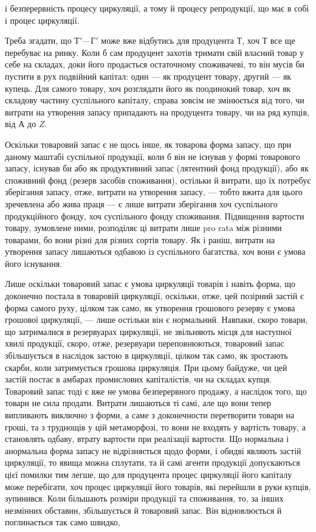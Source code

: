 \parcont{}  %
і безперервність процесу циркуляції, а тому й процесу репродукції, що
має в собі і процес циркуляції.

Треба згадати, що $Т' — Г'$ може вже відбутись для продуцента $Т$,
хоч $Т$ все ще перебуває на ринку. Коли б сам продуцент захотів тримати
свій власний товар у себе на складах, доки його продасться остаточному
споживачеві, то він мусів би пустити в рух подвійний капітал:
один — як продуцент товару, другий — як купець. Для самого товару,
хоч розглядати його як поодинокий товар, хоч як складову частину
суспільного капіталу, справа зовсім не змінюється від того, чи витрати
на утворення запасу припадають на продуцента товару, чи на ряд купців,
від $А$ до $Z$.

Оскільки товаровий запас є не щось інше, як товарова форма запасу,
що при даному маштабі суспільної продукції, коли б він не існував у
формі товарового запасу, існував би або як продуктивний запас (лятентний
фонд продукції), або як споживний фонд (резерв засобів споживання),
остільки й витрати, що їх потребує зберігання запасу, отже, витрати на
утворення запасу, — тобто вжита для цього зречевлена або жива праця —
є лише витрати зберігання хоч суспільного продукційного фонду,
хоч суспільного фонду споживання. Підвищення вартости товару,
зумовлене ними, розподіляє ці витрати лише pro rata між різними
товарами, бо вони різні для різних сортів товару. Як і раніш,
витрати на утворення запасу лишаються одбавою із суспільного багатства,
хоч вони є умова його існування.

Лише оскільки товаровий запас є умова циркуляції товарів і навіть
форма, що доконечно постала в товаровій циркуляції, оскільки, отже,
цей позірний застій є форма самого руху, цілком так само, як утворення
грошового резерву є умова грошової циркуляції, — лише остільки
він є нормальний. Навпаки, скоро товари, що затрималися в резервуарах
циркуляції, не звільняють місця для наступної хвилі продукції,
скоро, отже, резервуари переповнюються, товаровий запас збільшується
в наслідок застою в циркуляції, цілком так само, як зростають
скарби, коли затримується грошова циркуляція. При цьому
байдуже, чи цей застій постає в амбарах промислових капіталістів, чи
на складах купця. Товаровий запас тоді є вже не умова безперервного
продажу, а наслідок того, що товари не сила продати. Витрати лишаються
ті самі, але що вони тепер випливають виключно з форми, а саме з
доконечности перетворити товари на гроші, та з труднощів у цій метаморфозі,
то вони не входять у вартість товару, а становлять одбаву, втрату
вартости при реалізації вартости. Що нормальна і анормальна форма
запасу не відрізняється щодо форми, і обидві являють застій циркуляції,
то явища можна сплутати, та й самі агенти продукції допускаються
цієї помилки тим легше, що для продуцента процес циркуляції
його капіталу може перебігати, хоч процес циркуляції його товарів,
які перейшли в руки купців, зупинився. Коли більшають розміри
продукції та споживання, то, за інших незмінних обставин, збільшується
й товаровий запас. Він відновлюється й поглинається так само швидко,
\parbreak{}  %
